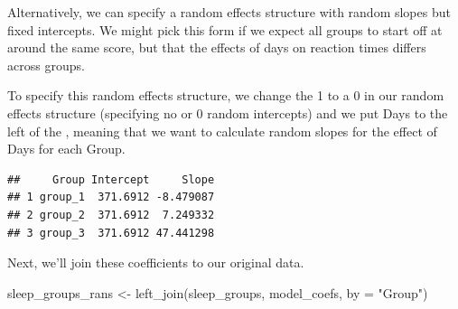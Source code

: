 \documentclass[
]{book}
\newenvironment{Shaded}{\begin{snugshade}}{\end{snugshade}}
\newcommand{\AttributeTok}[1]{\textcolor[rgb]{0.77,0.63,0.00}{#1}}
\newcommand{\CommentTok}[1]{\textcolor[rgb]{0.56,0.35,0.01}{\textit{#1}}}
\newcommand{\DecValTok}[1]{\textcolor[rgb]{0.00,0.00,0.81}{#1}}
\newcommand{\FunctionTok}[1]{\textcolor[rgb]{0.00,0.00,0.00}{#1}}
\newcommand{\NormalTok}[1]{#1}
\newcommand{\OtherTok}[1]{\textcolor[rgb]{0.56,0.35,0.01}{#1}}
\newcommand{\SpecialCharTok}[1]{\textcolor[rgb]{0.00,0.00,0.00}{#1}}
\newcommand{\StringTok}[1]{\textcolor[rgb]{0.31,0.60,0.02}{#1}}
\begin{document}
Alternatively, we can specify a random effects structure with random slopes but fixed intercepts. We might pick this form if we expect all groups to start off at around the same score, but that the effects of days on reaction times differs across groups.

To specify this random effects structure, we change the 1 to a 0 in our random effects structure (specifying no or 0 random intercepts) and we put Days to the left of the \texttt{\textbar{}}, meaning that we want to calculate random slopes for the effect of Days for each Group.

\begin{Shaded}
\end{Shaded}

\begin{verbatim}
##     Group Intercept     Slope
## 1 group_1  371.6912 -8.479087
## 2 group_2  371.6912  7.249332
## 3 group_3  371.6912 47.441298
\end{verbatim}

Next, we'll join these coefficients to our original data.

\begin{Shaded}
\begin{Highlighting}[]
\NormalTok{sleep\_groups\_rans }\OtherTok{\textless{}{-}} \FunctionTok{left\_join}\NormalTok{(sleep\_groups, model\_coefs, }\AttributeTok{by =} \StringTok{"Group"}\NormalTok{)}
\end{Highlighting}
\end{Shaded}
\end{document}
